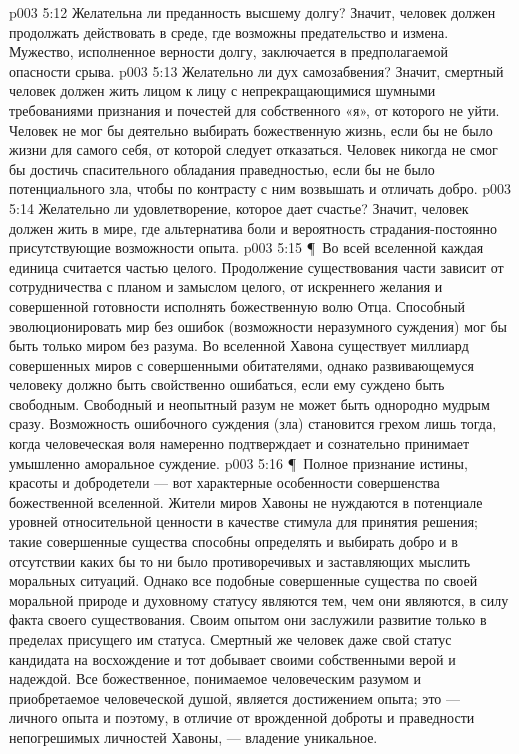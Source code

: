 \vs p003 5:12 \bibnobreakspace Желательна ли  преданность высшему долгу? Значит, человек должен продолжать действовать в среде, где возможны предательство и измена. Мужество, исполненное верности долгу, заключается в предполагаемой опасности срыва.
\vs p003 5:13 \bibnobreakspace Желательно ли  дух самозабвения? Значит, смертный человек должен жить лицом к лицу с непрекращающимися шумными требованиями признания и почестей для собственного «я», от которого не уйти. Человек не мог бы деятельно выбирать божественную жизнь, если бы не было жизни для самого себя, от которой следует отказаться. Человек никогда не смог бы достичь спасительного обладания праведностью, если бы не было потенциального зла, чтобы по контрасту с ним возвышать и отличать добро.
\vs p003 5:14 \bibnobreakspace Желательно ли  удовлетворение, которое дает счастье? Значит, человек должен жить в мире, где альтернатива боли и вероятность страдания\hyp{}постоянно присутствующие возможности опыта.
\vs p003 5:15 \P\ Во всей вселенной каждая единица считается частью целого. Продолжение существования части зависит от сотрудничества с планом и замыслом целого, от искреннего желания и совершенной готовности исполнять божественную волю Отца. Способный эволюционировать мир без ошибок (возможности неразумного суждения) мог бы быть только миром без  разума. Во вселенной Хавона существует миллиард совершенных миров с совершенными обитателями, однако развивающемуся человеку должно быть свойственно ошибаться, если ему суждено быть свободным. Свободный и неопытный разум не может быть однородно мудрым сразу. Возможность ошибочного суждения (зла) становится грехом лишь тогда, когда человеческая воля намеренно подтверждает и сознательно принимает умышленно аморальное суждение.
\vs p003 5:16 \P\ Полное признание истины, красоты и добродетели --- вот характерные особенности совершенства божественной вселенной. Жители миров Хавоны не нуждаются в потенциале уровней относительной ценности в качестве стимула для принятия решения; такие совершенные существа способны определять и выбирать добро и в отсутствии каких бы то ни было противоречивых и заставляющих мыслить моральных ситуаций. Однако все подобные совершенные существа по своей моральной природе и духовному статусу являются тем, чем они являются, в силу факта своего существования. Своим опытом они заслужили развитие только в пределах присущего им статуса. Смертный же человек даже свой статус кандидата на восхождение и тот добывает своими собственными верой и надеждой. Все божественное, понимаемое человеческим разумом и приобретаемое человеческой душой, является достижением опыта; это ---  личного опыта и поэтому, в отличие от врожденной доброты и праведности непогрешимых личностей Хавоны, --- владение уникальное.
